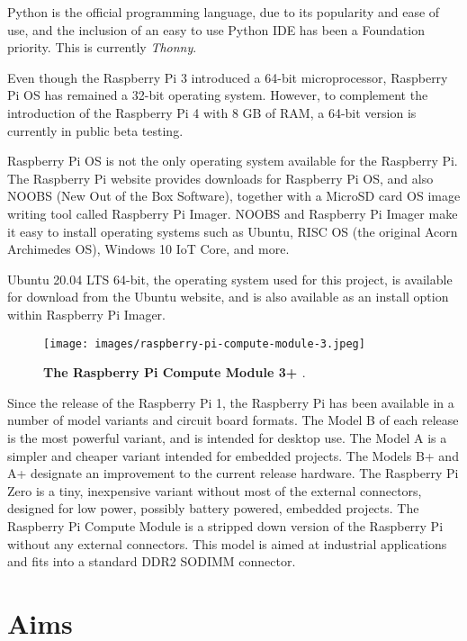 Python is the official programming language, due to its popularity and ease of use, and the inclusion of an easy to use Python IDE has been a Foundation priority. This is currently \emph{Thonny}. 

Even though the Raspberry Pi 3 introduced a 64-bit microprocessor, Raspberry Pi OS has remained a 32-bit operating system. However, to complement the introduction of the Raspberry Pi 4 with 8 GB of RAM, a 64-bit version is currently in public beta testing.

Raspberry Pi OS is not the only operating system available for the Raspberry Pi. The Raspberry Pi website provides downloads for Raspberry Pi OS, and also NOOBS (New Out of the Box Software), together with a MicroSD card OS image writing tool called Raspberry Pi Imager. NOOBS and Raspberry Pi Imager make it easy to install operating systems such as Ubuntu, RISC OS (the original Acorn Archimedes OS), Windows 10 IoT Core, and more.

Ubuntu 20.04 LTS 64-bit, the operating system used for this project, is available for download from the Ubuntu website, and is also available as an install option within Raspberry Pi Imager.

\begin{figure}
	\centering	
	\texttt{[image: images/raspberry-pi-compute-module-3.jpeg]}
	\caption{\textbf{The Raspberry Pi Compute Module 3+ \cite{raspberry-pi-cm3}}.}
\end{figure}

Since the release of the Raspberry Pi 1, the Raspberry Pi has been available in a number of model variants and circuit board formats. The Model B of each release is the most powerful variant, and is intended for desktop use. The Model A is a simpler and cheaper variant intended for embedded projects. The Models B+ and A+ designate an improvement to the current release hardware. The Raspberry Pi Zero is a tiny, inexpensive variant without most of the external connectors, designed for low power, possibly battery powered, embedded projects. The Raspberry Pi Compute Module is a stripped down version of the Raspberry Pi without any external connectors. This model is aimed at industrial applications and fits into a standard DDR2 SODIMM connector.


%
%
\section{Aims}


%
%

